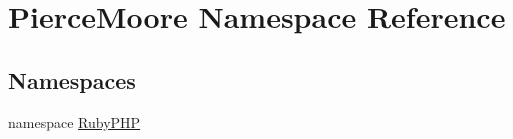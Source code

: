 \hypertarget{namespace_pierce_moore}{\section{Pierce\-Moore Namespace Reference}
\label{namespace_pierce_moore}
}
\subsection*{Namespaces}
\begin{DoxyCompactItemize}
\item 
namespace \hyperlink{namespace_pierce_moore_1_1_ruby_p_h_p}{Ruby\-P\-H\-P}
\end{DoxyCompactItemize}
